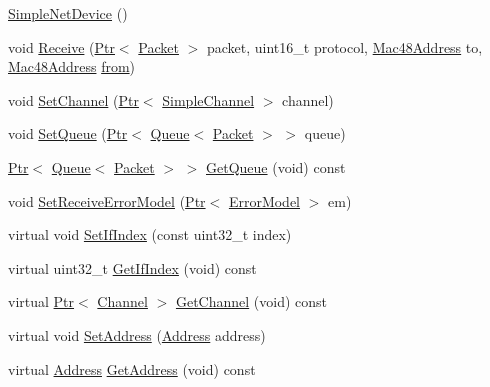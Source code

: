 \begin{DoxyCompactItemize}
\item 
\hyperlink{classns3_1_1SimpleNetDevice_ae329d675dae831a9e0534f02f415cf3e}{Simple\+Net\+Device} ()
\item 
void \hyperlink{classns3_1_1SimpleNetDevice_af603805c6f3145bde3e53c4c0d5108bc}{Receive} (\hyperlink{classns3_1_1Ptr}{Ptr}$<$ \hyperlink{classns3_1_1Packet}{Packet} $>$ packet, uint16\+\_\+t protocol, \hyperlink{classns3_1_1Mac48Address}{Mac48\+Address} to, \hyperlink{classns3_1_1Mac48Address}{Mac48\+Address} \hyperlink{lte__amc_8m_a1b4c81ff74eb1a626b5ade44c81004b3}{from})
\item 
void \hyperlink{classns3_1_1SimpleNetDevice_af9e9828ad584b5ba538f18f645f162e0}{Set\+Channel} (\hyperlink{classns3_1_1Ptr}{Ptr}$<$ \hyperlink{classns3_1_1SimpleChannel}{Simple\+Channel} $>$ channel)
\item 
void \hyperlink{classns3_1_1SimpleNetDevice_a48c08632e053a5359157b9b3351099cc}{Set\+Queue} (\hyperlink{classns3_1_1Ptr}{Ptr}$<$ \hyperlink{classns3_1_1Queue}{Queue}$<$ \hyperlink{classns3_1_1Packet}{Packet} $>$ $>$ queue)
\item 
\hyperlink{classns3_1_1Ptr}{Ptr}$<$ \hyperlink{classns3_1_1Queue}{Queue}$<$ \hyperlink{classns3_1_1Packet}{Packet} $>$ $>$ \hyperlink{classns3_1_1SimpleNetDevice_ab37f84da2d0755a6d353993dfa2cdc26}{Get\+Queue} (void) const 
\item 
void \hyperlink{classns3_1_1SimpleNetDevice_a8674cbc75fa8504bbf6c27b2ca1f5129}{Set\+Receive\+Error\+Model} (\hyperlink{classns3_1_1Ptr}{Ptr}$<$ \hyperlink{classns3_1_1ErrorModel}{Error\+Model} $>$ em)
\item 
virtual void \hyperlink{classns3_1_1SimpleNetDevice_abff4bf773c14b7ca7839f9347213604c}{Set\+If\+Index} (const uint32\+\_\+t index)
\item 
virtual uint32\+\_\+t \hyperlink{classns3_1_1SimpleNetDevice_ad49c077636c82c11b3d76dcb12dfa203}{Get\+If\+Index} (void) const 
\item 
virtual \hyperlink{classns3_1_1Ptr}{Ptr}$<$ \hyperlink{classns3_1_1Channel}{Channel} $>$ \hyperlink{classns3_1_1SimpleNetDevice_a4748d625a099333fed4fc1df2a4f0a09}{Get\+Channel} (void) const 
\item 
virtual void \hyperlink{classns3_1_1SimpleNetDevice_a968ef3e7318bac29d5f1d7d977029af4}{Set\+Address} (\hyperlink{classns3_1_1Address}{Address} address)
\item 
virtual \hyperlink{classns3_1_1Address}{Address} \hyperlink{classns3_1_1SimpleNetDevice_a813ed60e4386e8f46493a575f636606a}{Get\+Address} (void) const 

\end{DoxyCompactItemize}
